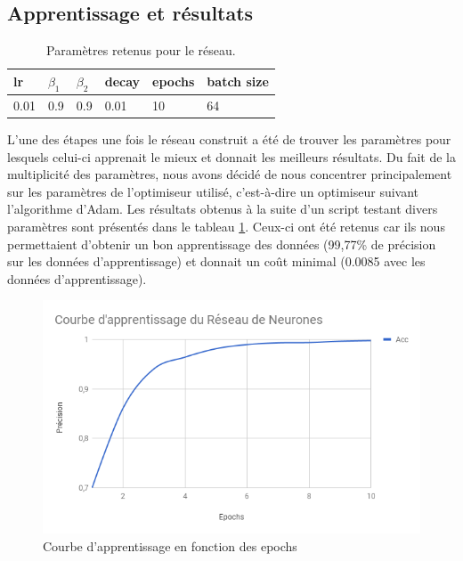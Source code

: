 \subsection{Apprentissage et résultats}

\begin{table}[h!]
	\centering
	\begin{tabular}{|l|l|l|l|l|l|}
		\hline
		\textbf{lr} & \textbf{$\beta_1$} & \textbf{$\beta_2$} & \textbf{decay} & \textbf{epochs} & \textbf{batch size} \\
		\hline
		0.01 & 0.9 & 0.9 & 0.01 & 10 & 64 \\
		\hline
	\end{tabular}
	\caption{Paramètres retenus pour le réseau.}
	\label{tab:saved_params}
\end{table}

\par L'une des étapes une fois le réseau construit a été de trouver les paramètres pour lesquels celui-ci apprenait le mieux et donnait les meilleurs résultats. Du fait de la multiplicité des paramètres, nous avons décidé de nous concentrer principalement sur les paramètres de l'optimiseur utilisé, c'est-à-dire un optimiseur suivant l'algorithme d'Adam. Les résultats obtenus à la suite d'un script testant divers paramètres sont présentés dans le tableau \ref{tab:saved_params}. Ceux-ci ont été retenus car ils nous permettaient d'obtenir un bon apprentissage des données (99,77\% de précision sur les données d'apprentissage) et donnait un coût minimal (0.0085 avec les données d'apprentissage).

\begin{figure}
	\centering
	\includegraphics[scale=0.75]{./img/learn_nn_chart.png}
	\caption{Courbe d'apprentissage en fonction des epochs}
	\label{fig:nn_app}
\end{figure}

